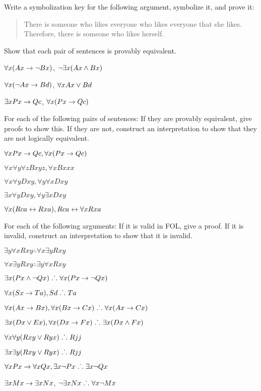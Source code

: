 \solutions
\problempart
\label{pr.likes}
Write a symbolization key for the following argument, symbolize it, and prove it:
\begin{quote}
There is someone who likes everyone who likes everyone that she likes. Therefore, there is someone who likes herself.
\end{quote}


\problempart
Show that each pair of sentences is provably equivalent.
\begin{earg}
\item $\forall x (Ax\rightarrow \neg Bx)$, $\neg\exists x(Ax \wedge Bx)$
\item $\forall x (\neg Ax\rightarrow Bd)$, $\forall x Ax \vee Bd$
\item $\exists x Px \rightarrow Qc$, $\forall x (Px \rightarrow Qc)$
\end{earg}

\solutions
\problempart
\label{pr.FOLequivornot}
For each of the following pairs of sentences: If they are provably equivalent, give proofs to show this. If they are not, construct an interpretation to show that they are not logically equivalent.
\begin{earg}
\item $\forall x Px \rightarrow Qc, \forall x (Px \rightarrow Qc)$
\item $\forall x\forall y \forall z Bxyz, \forall x Bxxx$
\item $\forall x\forall y Dxy, \forall y\forall x Dxy$
\item $\exists x\forall y Dxy, \forall y\exists x Dxy$
\item $\forall x (Rca \leftrightarrow Rxa), Rca \leftrightarrow \forall x Rxa$
\end{earg}

\solutions
\problempart
\label{pr.FOLvalidornot}
For each of the following arguments: If it is valid in FOL, give a proof. If it is invalid, construct an interpretation to show that it is invalid.
\begin{earg}
\item $\exists y\forall x Rxy \therefore \forall x\exists y Rxy$
\item $\forall x\exists y Rxy \therefore  \exists y\forall x Rxy$
\item $\exists x(Px \wedge \neg Qx) \mathrel{\ldotp\dot{}\,\ldotp} \forall x(Px \rightarrow \neg Qx)$
\item $\forall x(Sx \rightarrow Ta), Sd \mathrel{\ldotp\dot{}\,\ldotp} Ta$
\item $\forall x(Ax\rightarrow Bx), \forall x(Bx \rightarrow Cx) \mathrel{\ldotp\dot{}\,\ldotp} \forall x(Ax \rightarrow Cx)$
\item $\exists x(Dx \vee Ex), \forall x(Dx \rightarrow Fx) \mathrel{\ldotp\dot{}\,\ldotp} \exists x(Dx \wedge Fx)$
\item $\forall x\forall y(Rxy \vee Ryx) \mathrel{\ldotp\dot{}\,\ldotp} Rjj$
\item $\exists x\exists y(Rxy \vee Ryx) \mathrel{\ldotp\dot{}\,\ldotp} Rjj$
\item $\forall x Px \rightarrow \forall x Qx, \exists x \neg Px \mathrel{\ldotp\dot{}\,\ldotp} \exists x \neg Qx$
\item $\exists x Mx \rightarrow \exists x Nx$, $\neg \exists x Nx\mathrel{\ldotp\dot{}\,\ldotp}  \forall x \neg Mx$
\end{earg}

